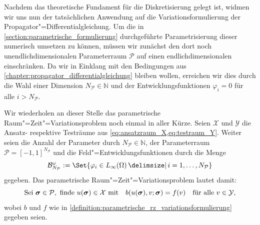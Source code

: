 \documentclass[../main.tex]{subfiles}
\begin{document}
Nachdem das theoretische Fundament für die Diskretisierung gelegt ist, widmen wir uns nun der tatsächlichen Anwendung auf die Variationsformulierung der Propagator"=Differentialgleichung.
Um die in \cref{section:parametrische_formulierung} durchgeführte Parametrisierung dieser numerisch umsetzen zu können, müssen wir zunächst den dort noch unendlichdimensionalen Parameterraum $\mathcal P$ auf einen endlichdimensionalen einschränken.
Da wir in Einklang mit den Bedingungen aus \cref{chapter:propagator_differentialgleichung} bleiben wollen, erreichen wir dies durch die Wahl einer Dimension $N_{\mathcal P} \in \mathbb{N}$ und der Entwicklungsfunktionen $\varphi_{i} = 0$ für alle $i > N_{\mathcal P}$.

Wir wiederholen an dieser Stelle das parametrische Raum"=Zeit"=Variationsproblem noch einmal in aller Kürze.
Seien $\mathcal X$ und $\mathcal Y$ die Ansatz- respektive Testräume aus \cref{eq:ansatzraum_X,eq:testraum_Y}.
Weiter seien die Anzahl der Parameter durch $N_{\mathcal P} \in \mathbb{N}$, der Parameterraum $\mathcal P = [-1, 1]^{N_\mathcal P}$ und die Feld"=Entwicklungsfunktionen durch die Menge
\begin{equation}
    \mathcal B^{\omega}_{N_{\mathcal P}} := \Set{ \varphi_{i} \in L_{\infty}(\Omega) \given i = 1, \dots, N_{\mathcal P}}
\end{equation}
gegeben.
Das parametrische Raum"=Zeit"=Variationsproblem lautet damit:
\begin{equation}\label{eq:wiederholung_variationsproblem}
    \text{Sei }\bm \sigma \in \mathcal P, \text{ finde } u(\bm \sigma) \in \mathcal X \text{ mit} \quad b(u(\bm \sigma), v; \bm \sigma) = f(v) \quad \fa v \in \mathcal Y,
\end{equation}
wobei $b$ und $f$ wie in \cref{definition:parametrische_rz_variationsformulierung} gegeben seien.
\end{document}
